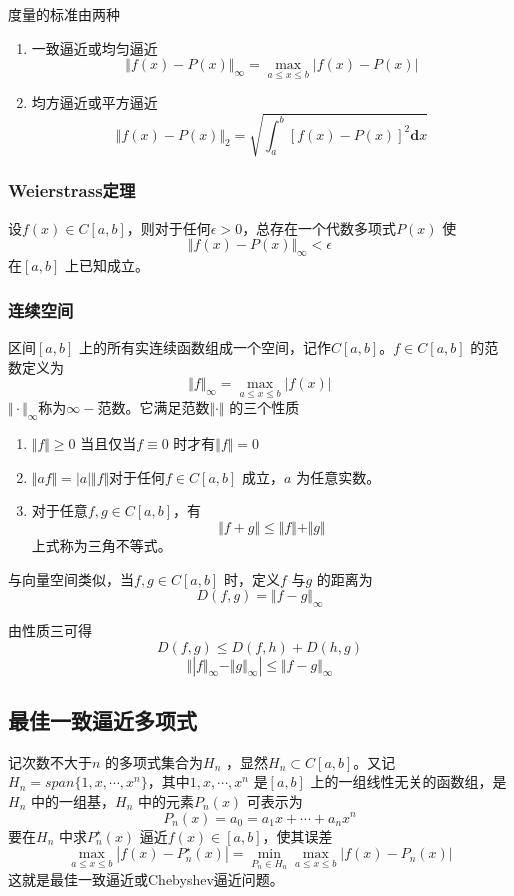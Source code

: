 \documentclass[a4paper]{article}
\begin{document}
度量的标准由两种
\begin{enumerate}
	\item 一致逼近或均匀逼近
		\[
			\Vert f(x) - P(x) \Vert_\infty = \max_{a \le x \le b} | f(x) - P(x)|
		\] 
	\item 均方逼近或平方逼近
		\[
			\Vert f(x) - P(x) \Vert_2 = \sqrt{\int_{a}^{b} [f(x) - P(x)]^2 \mathbf{d} x } 
		\] 
\end{enumerate}

\subsubsection{Weierstrass定理}
\begin{theorem}
	设$f(x) \in C[a,b]$，则对于任何$\epsilon > 0$，总存在一个代数多项式$P(x)$ 使
	\[
	\Vert f(x) - P(x) \Vert_\infty < \epsilon
	\] 
	在$[a,b]$ 上已知成立。
\end{theorem}

\subsubsection{连续空间}
区间$[a,b]$ 上的所有实连续函数组成一个空间，记作$C[a,b]$。$f \in C[a,b]$ 的范数定义为
\[
	\Vert f \Vert_\infty = \max_{a \le x \le b}| f(x) |
\] 
$\Vert \cdot \Vert_\infty$称为$\infty-$范数。它满足范数$\Vert \cdot \Vert$ 的三个性质
\begin{enumerate}
	\item $\Vert f \Vert \ge 0$ 当且仅当$f \equiv 0$ 时才有$\Vert f \Vert = 0$
	\item $\Vert a f \Vert = |a| \Vert f \Vert$对于任何$f \in C[a,b]$ 成立，$a$ 为任意实数。
	\item 对于任意$f,g \in C[a,b]$，有
		\[
		\Vert f + g \Vert \le \Vert f \Vert + \Vert g \Vert
		\] 
		上式称为三角不等式。
\end{enumerate}
与向量空间类似，当$f,g \in C[a,b]$ 时，定义$f$ 与$g$ 的距离为
\[
D(f,g) = \Vert f - g \Vert_\infty
\] 

由性质三可得
\[
D(f,g) \le  D(f,h) + D(h,g)
\] 
\[
\Vert | f \Vert_\infty - \Vert g \Vert_\infty | \le \Vert f - g \Vert_\infty
\] 

\subsection{最佳一致逼近多项式}
记次数不大于$n$ 的多项式集合为$H_n$ ，显然$H_n \subset C[a,b]$。又记$H_n = span \{ 1,x,\cdots,x^{n} \}$，其中$1, x,\cdots,x^{n}$ 是$[a,b]$ 上的一组线性无关的函数组，是$H_n$ 中的一组基，$H_n$ 中的元素$P_n(x)$ 可表示为
\[
P_n(x) = a_0 = a_1 x + \cdots + a_n x^n
\] 
要在$H_n$ 中求$P_n^{\star}(x)$ 逼近$f(x) \in [a,b]$，使其误差
\[
	\max_{a \le x \le b} |f(x) - P_n^{\star} (x) | = \min_{P_n \in H_n} \max_{a \le x \le b} | f(x) - P_n(x)|
\] 
这就是最佳一致逼近或Chebyshev逼近问题。
\end{document}
